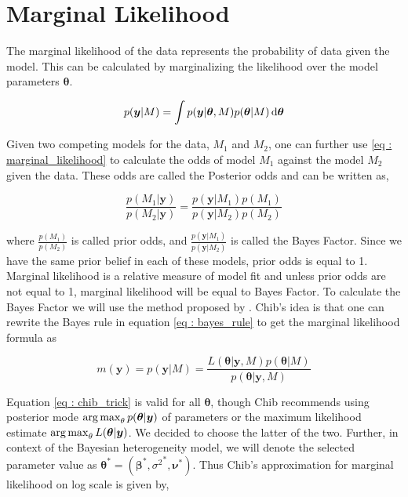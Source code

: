 \section{Marginal Likelihood}
\label{sec : marginal_likelihood}

The marginal likelihood of the data represents the probability of data given the model. This can be calculated by marginalizing the likelihood over the model parameters $\boldsymbol{\theta}$. 

\begin{equation}
\label{eq : marginal_likelihood}
p(\boldsymbol{y}|M) = \int p(\boldsymbol{y}|\boldsymbol{\theta}, M) p(\boldsymbol{\theta}|M) \mathop{}\!\mathrm{d} \boldsymbol{\theta}
\end{equation}

Given two competing models for the data, $M_1$ and $M_2$, one can further use \ref{eq : marginal_likelihood} to calculate the odds of model $M_1$ against the model $M_2$ given the data. These odds are called the Posterior odds and can be written as,

$$\frac {p(M_1|\boldsymbol{y})}{p(M_2|\boldsymbol{y})} = \frac {p(\boldsymbol{y}|M_1) p(M_1)} {p(\boldsymbol{y}|M_2) p(M_2)}$$

where $\frac {p(M_1)}{p(M_2)}$ is called prior odds, and $\frac {p(\boldsymbol{y}|M_1)} {p(\boldsymbol{y}|M_2)}$ is called the Bayes Factor. Since we have the same prior belief in each of these models, prior odds is equal to 1. Marginal likelihood is a relative measure of model fit and unless prior odds are not equal to 1, marginal likelihood will be equal to Bayes Factor. To calculate the Bayes Factor we will use the method proposed by \citet{chib_marginal_1995}. Chib's idea is that one can rewrite the Bayes rule in equation \ref{eq : bayes_rule} to get the marginal likelihood formula as

\begin{equation}
\label{eq : chib_trick}
m(\boldsymbol{y}) = p(\boldsymbol{y}|M) = \dfrac {L(\boldsymbol{\theta}|\boldsymbol{y}, M) p(\boldsymbol{\theta}|M)} {p(\boldsymbol{\theta}|\boldsymbol{y}, M)}
\end{equation}

Equation \ref{eq : chib_trick} is valid for all $\boldsymbol{\theta}$, though Chib recommends using posterior mode $\operatorname*{arg\,max}_\theta p(\boldsymbol{\theta}|\boldsymbol{y})$ of parameters or the maximum likelihood estimate $\operatorname*{arg\,max}_\theta L(\boldsymbol{\theta}|\boldsymbol{y})$. We decided to choose the latter of the two. Further, in context of the Bayesian heterogeneity model, we will denote the selected parameter value as 
$\boldsymbol{\theta}^*=(\boldsymbol{\beta}^*, {\sigma^2}^*, \boldsymbol{\nu}^*)$. Thus Chib's approximation for marginal likelihood on log scale is given by,

